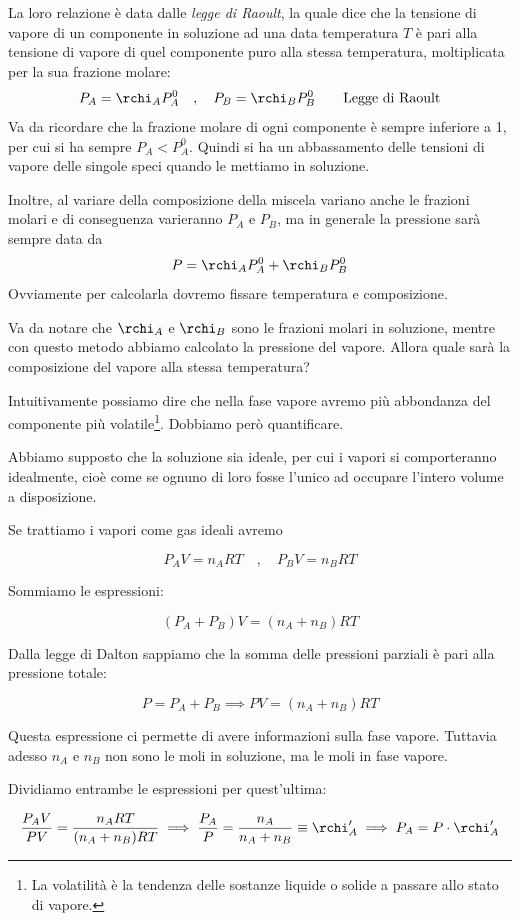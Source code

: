 La loro relazione è data dalle \textit{legge di Raoult}, la quale dice che la tensione di vapore di un componente in soluzione ad una data temperatura $T$ è pari alla tensione di vapore di quel componente puro alla stessa temperatura, moltiplicata per la sua frazione molare:
$$P_A=\rchi_A P^0_A
\quad,\quad P_B=\rchi_B P^0_B \qquad \text{Legge di Raoult}$$
Va da ricordare che la frazione molare di ogni componente è sempre inferiore a 1, per cui si ha sempre $P_A < P^0_A$. Quindi si ha un abbassamento delle tensioni di vapore delle singole speci quando le mettiamo in soluzione.

Inoltre, al variare della composizione della miscela variano anche le frazioni molari e di conseguenza varieranno $P_A$ e $P_B$, ma in generale la pressione sarà sempre data da
$$P=\rchi_A P^0_A + \rchi_B P^0_B$$
Ovviamente per calcolarla dovremo fissare temperatura e composizione.

Va da notare che $\rchi_A$ e $\rchi_B$ sono le frazioni molari in soluzione, mentre con questo metodo abbiamo calcolato la pressione del vapore. Allora quale sarà la composizione del vapore alla stessa temperatura?

Intuitivamente possiamo dire che nella fase vapore avremo più abbondanza del componente più volatile\footnote{La volatilità è la tendenza delle sostanze liquide o solide a passare allo stato di vapore.}. Dobbiamo però quantificare.

Abbiamo supposto che la soluzione sia ideale, per cui i vapori si comporteranno idealmente, cioè come se ognuno di loro fosse l'unico ad occupare l'intero volume a disposizione.

Se trattiamo i vapori come gas ideali avremo

$$P_AV=n_ART
\quad,\quad
P_BV=n_BRT$$

Sommiamo le espressioni:

$$(P_A + P_B)V= (n_A + n_B)RT$$

Dalla legge di Dalton sappiamo che la somma delle pressioni parziali è pari alla pressione totale:

$$P=P_A + P_B \implies PV=(n_A + n_B)RT$$

Questa espressione ci permette di avere informazioni sulla fase vapore. Tuttavia adesso $n_A$ e $n_B$ non sono le moli in soluzione, ma le moli in fase vapore.

Dividiamo entrambe le espressioni per quest'ultima:

$$\frac{P_AV}{PV}= \frac{n_ART}{(n_A + n_B)RT}
\implies
\frac{P_A}{P} = \frac{n_A}{n_A + n_B}\equiv \rchi '_A
\implies
P_A=P \cdot \rchi '_A$$

